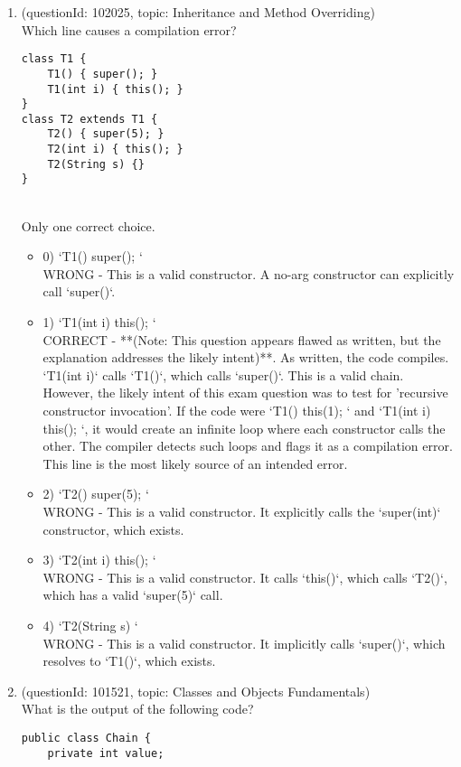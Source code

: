 \documentclass[12pt]{article}
\begin{document}
\begin{enumerate}[label=(\arabic*)]
\begin{itemize}
\end{itemize}
\item (questionId: 102025, topic: Inheritance and Method Overriding) \\ 
Which line causes a compilation error?
\begin{verbatim}
class T1 {
    T1() { super(); }
    T1(int i) { this(); }
}
class T2 extends T1 {
    T2() { super(5); }
    T2(int i) { this(); }
    T2(String s) {}
}
\end{verbatim}
\\ \noindent Only one correct choice. 
\begin{itemize}
\item 0) `T1() { super(); }`
 \\ 
WRONG - This is a valid constructor. A no-arg constructor can explicitly call `super()`.

\item 1) `T1(int i) { this(); }`
 \\ 
CORRECT - **(Note: This question appears flawed as written, but the explanation addresses the likely intent)**. As written, the code compiles. `T1(int i)` calls `T1()`, which calls `super()`. This is a valid chain. However, the likely intent of this exam question was to test for 'recursive constructor invocation'. If the code were `T1(){ this(1); }` and `T1(int i){ this(); }`, it would create an infinite loop where each constructor calls the other. The compiler detects such loops and flags it as a compilation error. This line is the most likely source of an intended error.

\item 2) `T2() { super(5); }`
 \\ 
WRONG - This is a valid constructor. It explicitly calls the `super(int)` constructor, which exists.

\item 3) `T2(int i) { this(); }`
 \\ 
WRONG - This is a valid constructor. It calls `this()`, which calls `T2()`, which has a valid `super(5)` call.

\item 4) `T2(String s) {}`
 \\ 
WRONG - This is a valid constructor. It implicitly calls `super()`, which resolves to `T1()`, which exists.

\end{itemize}
\item (questionId: 101521, topic: Classes and Objects Fundamentals) \\ 
What is the output of the following code?\n\begin{verbatim}
public class Chain {
    private int value;


\end{verbatim}
\end{enumerate}
\end{document}
